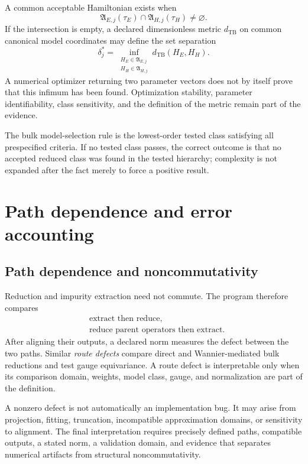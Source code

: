 A common acceptable Hamiltonian exists when
\begin{equation}
  \mathfrak A_{E,j}(\tau_E)
  \cap
  \mathfrak A_{H,j}(\tau_H)
  \neq\varnothing.
\end{equation}
If the intersection is empty, a declared dimensionless metric
$d_{\mathrm{TB}}$ on common canonical model coordinates may define the set
separation
\begin{equation}
  \delta_j^{\ast}
  =
  \inf_{\substack{
    H_E\in\mathfrak A_{E,j}\\
    H_H\in\mathfrak A_{H,j}}}
  d_{\mathrm{TB}}(H_E,H_H).
\end{equation}
A numerical optimizer returning two parameter vectors does not by itself prove
that this infimum has been found. Optimization stability, parameter
identifiability, class sensitivity, and the definition of the metric remain
part of the evidence.

The bulk model-selection rule is the lowest-order tested class satisfying all
prespecified criteria. If no tested class passes, the correct outcome is that
no accepted reduced class was found in the tested hierarchy; complexity is not
expanded after the fact merely to force a positive result.

\section{Path dependence and error accounting}

\subsection{Path dependence and noncommutativity}


Reduction and impurity extraction need not commute. The program therefore
compares
\begin{align}
  &\text{extract then reduce},\\
  &\text{reduce parent operators then extract}.
\end{align}
After aligning their outputs, a declared norm measures the defect between the
two paths. Similar \emph{route defects} compare direct and Wannier-mediated bulk
reductions and test gauge equivariance. A route defect is interpretable only
when its comparison domain, weights, model class, gauge, and normalization are
part of the definition.

A nonzero defect is not automatically an implementation bug. It may arise from
projection, fitting, truncation, incompatible approximation domains, or
sensitivity to alignment. The final interpretation requires precisely defined
paths, compatible outputs, a stated norm, a validation domain, and evidence
that separates numerical artifacts from structural noncommutativity.

